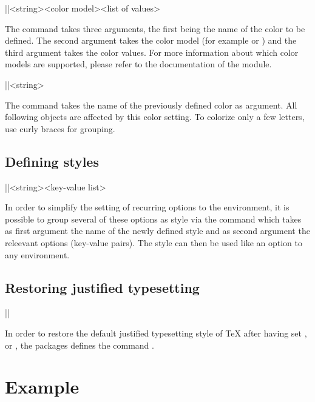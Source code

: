 \documentclass[a4paper]{article}
\begin{document}
\begin{macrodef}
|\leporellocolordefine|{<string>}{<color model>}{<list of values>}
\end{macrodef}
The command \macro{\leporellocolordefine} takes three arguments, the first being the name of the color to be defined. The second argument takes the color model (for example  or ) and the third argument takes the color values. For more information about which color models are supported, please refer to the documentation of the  module.

\begin{macrodef}
|\leporellocolorselect|{<string>}
\end{macrodef}
The command \macro{\leporellocolorselect} takes the name of the previously defined color as argument. All following objects are affected by this color setting. To colorize only a few letters, use curly braces for grouping.

\subsection{Defining styles}

\begin{macrodef}
|\leporellosetstyle|{<string>}{<key-value list>}
\end{macrodef}
In order to simplify the setting of recurring options to the  environment, it is possible to group several of these options as style via the \macro{\leporellosetstyle} command which takes as first argument the name of the newly defined style and as second argument the releevant options (key-value pairs). The style can then be used like an option to any  environment.

\subsection{Restoring justified typesetting}

\begin{macrodef}
|\leporellojustified|
\end{macrodef}
In order to restore the default justified typesetting style of TeX after having set \macro{\raggedright}, \macro{\raggedleft} or \macro{\centering}, the packages defines the command \macro{\leporellojustified}.

\section{Example}
\end{document}
